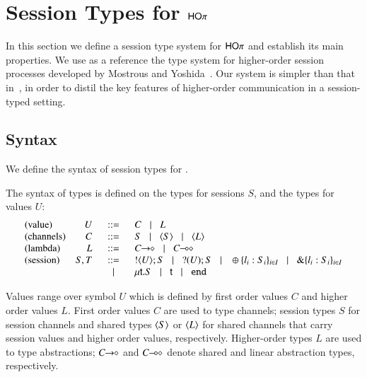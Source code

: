 \section{Session Types for $\mathsf{HO}\pi$}
\label{s:types}

In this section we define a session type system for
$\mathsf{HO}\pi$ and establish its main properties. We use as
a reference the type system for higher-order session processes 
developed by Mostrous and Yoshida~\cite{tlca07}.
Our system is simpler than that in~\cite{tlca07}, in order to distil the key
features of higher-order communication in a session-typed setting.


\subsection{Syntax}

We define the syntax of session types for \HOp.

\begin{definition}\rm
	\label{def:types}
	The syntax of types is defined on the types for sessions $S$,
	and the types for values $U$:
	\[
	\begin{array}{lrcl}
		\textrm{(value)} & U & \bnfis &		C \bnfbar L 
		\\

		\textrm{(channels)} & C & \bnfis &	S \bnfbar \chtype{S} \bnfbar \chtype{L}
		\\

		\textrm{(lambda)} & L & \bnfis &	\shot{C} \bnfbar \lhot{C}
		\\

		\textrm{(session)} & S,T & \bnfis & 	\btout{U} S \bnfbar \btinp{U} S
							\bnfbar \btsel{l_i:S_i}_{i \in I} \bnfbar \btbra{l_i:S_i}_{i \in I}\\
					&&\bnfbar&	\trec{t}{S} \bnfbar \vart{t}  \bnfbar \tinact
	\end{array}
	\]
\end{definition}
%
\noi Values range over symbol $U$ which is defined by
first order values $C$ and higher order values $L$.
\noi First order values $C$ are used to type channels;
session types $S$ for session channels and shared types
$\langle S \rangle$ or $\langle L \rangle$ for shared channels that
carry session values and higher order values, respectively.
Higher-order types $L$ are used to type abstractions;
$C\!\! \rightarrow\!\! \diamond$ and $C\!\! \multimap\!\! \diamond$ denote
shared and linear abstraction types, respectively.

